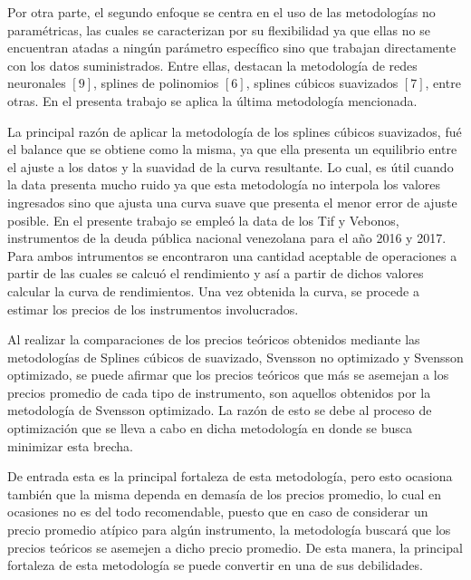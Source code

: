 \hspace{0.4cm}Por otra parte, el segundo enfoque se centra en el uso de las metodolog\'ias no param\'etricas, las cuales se caracterizan por su flexibilidad ya que ellas no se encuentran atadas a ning\'un par\'ametro espec\'ifico sino que trabajan directamente con los datos suministrados. Entre ellas, destacan la metodolog\'ia de redes neuronales $[9]$, splines de polinomios $[6]$, splines c\'ubicos suavizados $[7]$, entre otras. En el presenta trabajo se aplica la \'ultima metodolog\'ia mencionada.


\hspace{0.4cm} La principal raz\'on de aplicar la metodolog\'ia de los splines c\'ubicos suavizados, fu\'e el balance que se obtiene como la misma, ya que ella presenta un equilibrio entre el ajuste a los datos y la suavidad de la curva resultante. Lo cual, es \'util cuando la data presenta mucho ruido ya que esta metodolog\'ia no interpola los valores ingresados sino que ajusta una curva suave que presenta el menor error de ajuste posible. En el presente trabajo se emple\'o la data de los Tif y Vebonos, instrumentos de la deuda p\'ublica nacional venezolana para el a\~no 2016 y 2017. Para ambos intrumentos se encontraron una cantidad aceptable de operaciones a partir de las cuales se calcu\'o el rendimiento y as\'i a partir de dichos valores calcular la curva de rendimientos. Una vez obtenida la curva, se procede a estimar los precios de los instrumentos involucrados.

\hspace{0.4cm} Al realizar la comparaciones de los precios te\'oricos obtenidos mediante las metodolog\'ias de Splines c\'ubicos de suavizado, Svensson no optimizado y Svensson optimizado, se puede afirmar que los precios te\'oricos que m\'as se asemejan a los precios promedio de cada tipo de instrumento, son aquellos obtenidos por la metodolog\'ia de Svensson optimizado. La raz\'on de esto se debe al proceso de optimizaci\'on que se lleva a cabo en dicha metodolog\'ia en donde se busca minimizar esta brecha. 


\hspace{0.4cm}De entrada esta es la principal fortaleza de esta metodolog\'ia, pero esto ocasiona tambi\'en que la misma dependa en demas\'ia de los precios promedio, lo cual en ocasiones no es del todo recomendable, puesto que en caso de considerar un precio promedio at\'ipico para alg\'un instrumento, la metodolog\'ia buscar\'a que los precios te\'oricos se asemejen a dicho precio promedio. De esta manera, la principal fortaleza de esta metodolog\'ia se puede convertir en una de sus debilidades.

